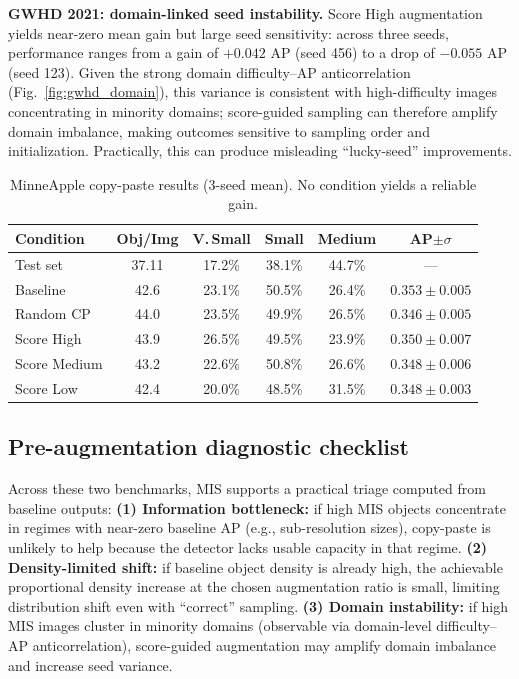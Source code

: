 \documentclass[conference]{IEEEtran}
\begin{document}
\textbf{GWHD 2021: domain-linked seed instability.}
Score High augmentation yields near-zero mean gain but 
large seed sensitivity: across three seeds, performance ranges from a gain of 
$+0.042$ AP (seed 456)
to a drop of $-0.055$ AP (seed 123).
Given the strong domain difficulty--AP anticorrelation (Fig.~\ref{fig:gwhd_domain}), this variance is consistent with high-difficulty images concentrating in minority domains;
score-guided sampling can therefore amplify domain imbalance, making outcomes sensitive to sampling order and initialization.
Practically, this can produce misleading ``lucky-seed'' improvements.

\begin{table}[t]
\centering
\caption{MinneApple copy-paste results (3-seed mean). No condition yields a reliable gain.}
\label{tab:aug}
\footnotesize
\setlength{\tabcolsep}{3.0pt}
\renewcommand{\arraystretch}{0.95}
\begin{tabular}{lccccc}
\toprule
\textbf{Condition} & \textbf{Obj/Img} & \textbf{V.\,Small} & \textbf{Small} & \textbf{Medium} & \textbf{AP$\pm\sigma$} \\
\midrule
Test set      & 37.11 & 17.2\% & 38.1\% & 44.7\% & --- \\
\midrule
Baseline      & 42.6  & 23.1\% & 50.5\% & 26.4\% & $0.353\pm0.005$ \\
Random CP     & 44.0  & 23.5\% & 49.9\% & 26.5\% & $0.346\pm0.005$ \\
Score High    & 43.9  & 26.5\% & 49.5\% & 23.9\% & $0.350\pm0.007$ \\
Score Medium  & 43.2  & 22.6\% & 50.8\% & 26.6\% & $0.348\pm0.006$ \\
Score Low     & 42.4  & 20.0\% & 48.5\% & 31.5\% & $0.348\pm0.003$ \\
\bottomrule
\end{tabular}
\end{table}

\subsection{Pre-augmentation diagnostic checklist}
Across these two benchmarks, MIS supports a practical triage computed from baseline outputs:
\textbf{(1) Information bottleneck:} if high MIS objects concentrate in regimes with near-zero baseline AP (e.g., sub-resolution sizes),
copy-paste is unlikely to help because the detector lacks usable capacity in that regime.
\textbf{(2) Density-limited shift:} if baseline object density is already high, the achievable proportional density increase at the chosen augmentation ratio is small,
limiting distribution shift even with ``correct'' sampling.
\textbf{(3) Domain instability:} if high MIS images cluster in minority domains (observable via domain-level difficulty--AP anticorrelation),
score-guided augmentation may amplify domain imbalance and increase seed variance.
\end{document}
